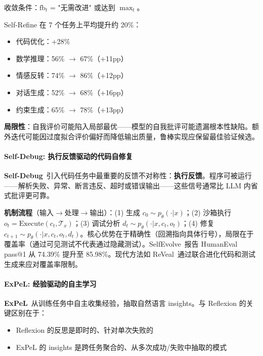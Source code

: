收敛条件：$\text{fb}_t$ = "无需改进" 或达到 $\max_t$。

Self-Refine 在 7 个任务上平均提升约 20\%：
\begin{itemize}
\item 代码优化：+28\%
\item 数学推理：56\% $\rightarrow$ 67\%（+11pp）
\item 情感反转：74\% $\rightarrow$ 86\%（+12pp）
\item 对话生成：52\% $\rightarrow$ 68\%（+16pp）
\item 约束生成：65\% $\rightarrow$ 78\%（+13pp）
\end{itemize}

\textbf{局限性}：自我评价可能陷入局部最优——模型的自我批评可能遗漏根本性缺陷。额外迭代可能因过度拟合评价偏好而降低输出质量，鲁棒实现应保留最佳验证候选。

\paragraph{Self-Debug: 执行反馈驱动的代码自修复}

\textbf{Self-Debug}~\citep{singh2023selfdebug}引入代码任务中最重要的反馈不对称性：\textbf{执行反馈}。程序可被运行——解析失败、异常、断言违反、超时或错误输出——这些信号通常比 LLM 内省式批评更可靠。

\textbf{机制流程}（输入$\to$处理$\to$输出）：(1) 生成 $c_0 \sim p_\theta(\cdot | x)$；(2) 沙箱执行 $o_t = \text{Execute}(c_t, \mathcal{T}_x)$；(3) 调试分析 $d_t \sim p_\theta(\cdot | x, c_t, o_t)$；(4) 修复 $c_{t+1} \sim p_\theta(\cdot | x, c_t, o_t, d_t)$。核心优势在于精确性（回溯指向具体行号），局限在于覆盖率（通过可见测试不代表通过隐藏测试）。SelfEvolve~\citep{selfevolve2023}报告 HumanEval pass@1 从 74.39\% 提升至 85.98\%。现代方法如 ReVeal~\citep{reveal2025}通过联合进化代码和测试生成来应对覆盖率限制。

\paragraph{ExPeL: 经验驱动的自主学习}

\textbf{ExPeL}~\citep{expel2023}从训练任务中自主收集经验，抽取自然语言 insights。与 Reflexion 的关键区别在于：
\begin{itemize}
\item Reflexion 的反思是即时的、针对单次失败的
\item ExPeL 的 insights 是跨任务聚合的、从多次成功/失败中抽取的模式
\end{itemize}

